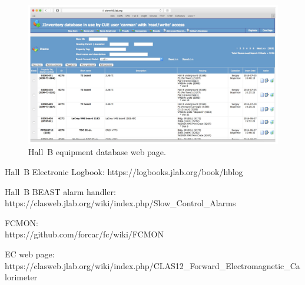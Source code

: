 \documentclass[letterpaper,10pt]{article}
\begin{document}
\begin{figure}[htbp]
  \centering
  \includegraphics[width= 7in, keepaspectratio = true]{inventory}
  \vspace{2mm}
\caption{Hall~B equipment database web page.}
\label{inventory}
\end{figure}

\clearpage

\vfil
\eject

\begin{thebibliography}{99}

  Hall~B Electronic Logbook: https://logbooks.jlab.org/book/hblog

  Hall~B BEAST alarm handler: \\
  https://clasweb.jlab.org/wiki/index.php/Slow\_Control\_Alarms

  FCMON:\\
  https://github.com/forcar/fc/wiki/FCMON  

  EC web page: \\
  https://clasweb.jlab.org/wiki/index.php/CLAS12\_Forward\_Electromagnetic\_Calorimeter
  
\end{thebibliography}
\end{document}
